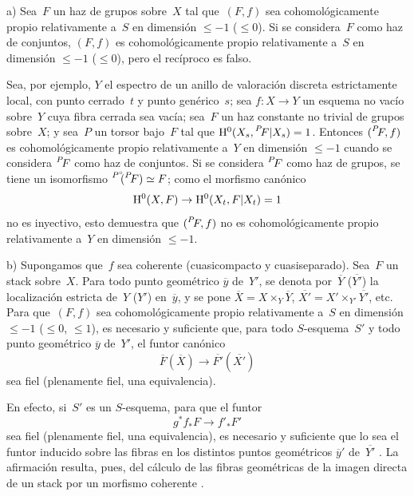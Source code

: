 
\begin{remarques}
\label{XIII.1.5}
a) Sea~$F$ un haz de grupos sobre~$X$ tal que~$(F,f)$ sea
cohomológicamente propio relativamente a~$S$ en dimensión
$\leqslant -1$ (\resp $\leqslant 0$). Si se considera~$F$ como haz de
conjuntos, $(F,f)$ es cohomológicamente propio relativamente a~$S$ en
dimensión $\leqslant -1$ (\resp $\leqslant 0$), pero el recíproco es
falso.

Sea, por ejemplo, $Y$ el espectro de un anillo de valoración discreta
estrictamente local, con punto cerrado~$t$ y punto genérico~$s$;
sea $f\colon X\to Y$ un esquema no vacío sobre~$Y$ cuya fibra cerrada
sea vacía; sea~$F$ un haz constante no trivial de grupos sobre~$X$; y
sea~$P$ un torsor bajo~$F$ tal que
$\H^0(X_s,\leftexp{P\mkern-4mu}{F}|X_s)=1$. Entonces
$(\leftexp{P\mkern-4mu}{F},f)$ es cohomológicamente propio relativamente
a~$Y$ en dimensión $\leqslant -1$ cuando se considera
$\leftexp{P\mkern-4mu}{F}$ como haz de conjuntos. Si se considera
$\leftexp{P\mkern-4mu}{F}$ como haz de grupos, se tiene un isomorfismo
${\vphantom{F}}^{P^\circ\mkern-7mu}(\leftexp{P\mkern-4mu}{F})\simeq F$;
como el morfismo canónico
$$
\mathrm H^0(X,F)\to\mathrm H^0(X_t,F|X_t)=1
$$
no es inyectivo, esto demuestra que
$(\leftexp{P\mkern-4mu}{F},f)$ no es cohomológicamente propio
relativamente a~$Y$ en dimensión $\leqslant -1$.

b) Supongamos que~$f$ sea coherente (\ie cuasicompacto y
cuasiseparado). Sea~$F$ un stack sobre~$X$. Para todo punto geométrico
$\overline{y}$ de~$Y'$, se denota por~$\overline{Y}$ (\resp $\overline{Y'}$)
la localización estricta de~$Y$ (\resp $Y'$) en~$\overline{y}$, y se pone
$\overline{X}=X\times_Y\overline{Y}$,
$\overline{X'}=X'\times_{Y'}\overline{Y'}$, etc. Para que~$(F,f)$ sea
cohomológicamente propio relativamente a~$S$ en dimensión
$\leqslant -1$ (\resp $\leqslant 0$, \resp $\leqslant 1$), es necesario
y suficiente que, para todo $S$-esquema~$S'$ y todo punto geométrico
$\overline{y}$ de~$Y'$, el funtor canónico
$$
\overline{F}(\overline{X})\to\overline{F'}(\overline{X'})
$$
sea fiel (\resp plenamente fiel, \resp una equivalencia).

En
efecto, si~$S'$ es un $S$-esquema, para que el funtor
$$
g^*f_*F\to f'_*F'
$$
sea fiel (\resp plenamente fiel, \resp una equivalencia), es necesario
y suficiente que lo sea el funtor inducido sobre las fibras en los
distintos puntos geométricos $\overline{y}'$ de~$\overline{Y'}$
\cite[III 2.1.5.9]{XIII.2}. La afirmación resulta, pues, del cálculo de
las fibras geométricas de la imagen directa de un stack por un morfismo
coherente \cite[VII 2.1.5]{XIII.2}.


\end{remarques}
